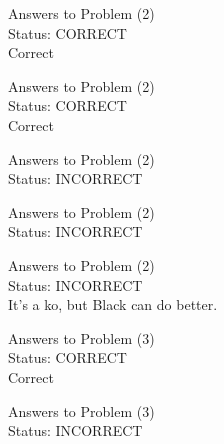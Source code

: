 \documentclass[11pt]{article}
\begin{document}
\begin{minipage}[t]{0.5\textwidth}
  {\centering
  
  Answers to Problem (2)\\
  Status: CORRECT\\
  Correct\\
  }
\end{minipage}
\begin{minipage}[t]{0.5\textwidth}
  {\centering
  
  Answers to Problem (2)\\
  Status: CORRECT\\
  Correct\\
  }
\end{minipage}
\begin{minipage}[t]{0.5\textwidth}
  {\centering
  
  Answers to Problem (2)\\
  Status: INCORRECT\\
  
  }
\end{minipage}
\begin{minipage}[t]{0.5\textwidth}
  {\centering
  
  Answers to Problem (2)\\
  Status: INCORRECT\\
  
  }
\end{minipage}
\begin{minipage}[t]{0.5\textwidth}
  {\centering
  
  Answers to Problem (2)\\
  Status: INCORRECT\\
  It's a ko, but Black can do better.\\
  }
\end{minipage}
\begin{minipage}[t]{0.5\textwidth}
  {\centering
  
  Answers to Problem (3)\\
  Status: CORRECT\\
  Correct\\
  }
\end{minipage}
\begin{minipage}[t]{0.5\textwidth}
  {\centering
  
  Answers to Problem (3)\\
  Status: INCORRECT\\
  
  }
\end{minipage}
\end{document}
